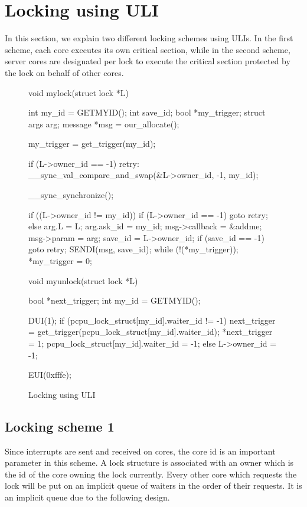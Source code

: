 \section{Locking using ULI}

In this section, we explain two different locking schemes using ULIs. In the
first scheme, each core executes its own critical section, while in the second
scheme, server cores are designated per lock to execute the critical section
protected by the lock on behalf of other cores.

\begin{figure}
\begin{code} 
void mylock(struct lock *L)
{
    int my_id  = GETMYID();
    int save_id;
    bool *my_trigger;
    struct args arg;
    message *msg = our_allocate();

    my_trigger = get_trigger(my_id);

    if (L->owner_id == -1)
retry:
        __sync_val_compare_and_swap(&L->owner_id, -1, my_id);

    __sync_synchronize();

    if ((L->owner_id != my_id)) {
        if (L->owner_id == -1) {
            goto retry;
        } else {
            arg.L = L;
            arg.ask_id = my_id;
            msg->callback = &addme;
            msg->param = arg;
            save_id = L->owner_id;
            if (save_id == -1)
                goto retry;
            SENDI(msg, save_id);
            while (!(*my_trigger));
        }
    }
    *my_trigger = 0;
}

void myunlock(struct lock *L)
{
    bool *next_trigger;
    int my_id = GETMYID();

    DUI(1);
    if (pcpu_lock_struct[my_id].waiter_id != -1) {
        next_trigger = get_trigger(pcpu_lock_struct[my_id].waiter_id);
        *next_trigger = 1;
        pcpu_lock_struct[my_id].waiter_id = -1;
    } else {
        L->owner_id = -1;
    }

    EUI(0xfffe);
}
\end{code}
\caption{Locking using ULI\label{fig-locking}}
\end{figure}

\subsection{Locking scheme 1}

Since interrupts are sent and received on cores, the core id is an important
parameter in this scheme. A lock structure is associated with an owner which is
the id of the core owning the lock currently. Every other core which requests
the lock will be put on an implicit queue of waiters in the order of their
requests. It is an implicit queue due to the following design.

